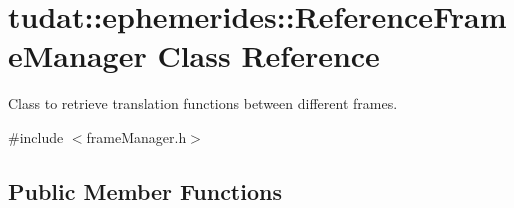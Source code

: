 \hypertarget{classtudat_1_1ephemerides_1_1ReferenceFrameManager}{}\section{tudat\+:\+:ephemerides\+:\+:Reference\+Frame\+Manager Class Reference}
\label{classtudat_1_1ephemerides_1_1ReferenceFrameManager}


Class to retrieve translation functions between different frames.  




{\ttfamily \#include $<$frame\+Manager.\+h$>$}

\subsection*{Public Member Functions}
